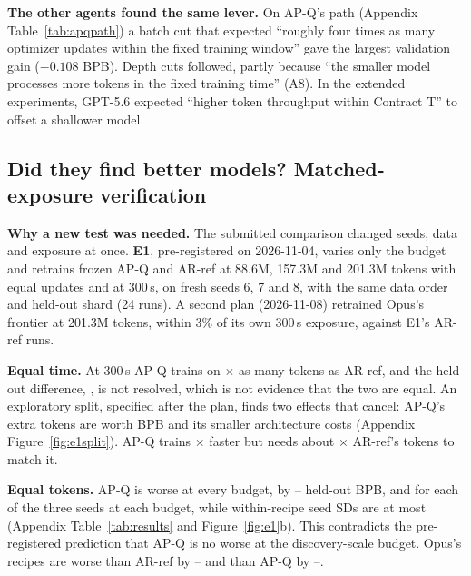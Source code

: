 \documentclass{article}
\begin{document}
 \textbf{The other agents found the same lever.} On AP-Q's path (Appendix Table~\ref{tab:apqpath}) a batch cut that expected ``roughly four times as many optimizer updates within the fixed training window'' gave the largest validation gain ($-0.108$ BPB). Depth cuts followed, partly because ``the smaller model processes more tokens in the fixed training time'' (A8). In the extended experiments, GPT-5.6 expected ``higher token throughput within Contract T'' to offset a shallower model.

\subsection{Did they find better models? Matched-exposure verification}\label{sec:verify}
 \textbf{Why a new test was needed.} The submitted comparison changed seeds, data and exposure at once. \textbf{E1}, pre-registered on 2026-11-04, varies only the budget and retrains frozen AP-Q and AR-ref at 88.6M, 157.3M and 201.3M tokens with equal updates and at 300\,s, on fresh seeds 6, 7 and 8, with the same data order and held-out shard (24 runs). A second plan (2026-11-08) retrained Opus's frontier at 201.3M tokens, within 3\% of its own 300\,s exposure, against E1's AR-ref runs.

 \textbf{Equal time.} At 300\,s AP-Q trains on \CREOneTokRatio$\times$ as many tokens as AR-ref, and the held-out difference, \CREOneTimeHeldThree{} \CREOneTimeHeldCI, is not resolved, which is not evidence that the two are equal. An exploratory split, specified after the plan, finds two effects that cancel: AP-Q's extra tokens are worth \CREOneExposure{} BPB and its smaller architecture costs \CREOneArch{} (Appendix Figure~\ref{fig:e1split}). AP-Q trains \CREOneRho$\times$ faster but needs about \CREOneK$\times$ AR-ref's tokens to match it.

 \textbf{Equal tokens.} AP-Q is worse at every budget, by \CREOneMatchedLoAbs--\CREOneMatchedHiAbs{} held-out BPB, and for each of the three seeds at each budget, while within-recipe seed SDs are at most \CREOneMaxSD{} (Appendix Table~\ref{tab:results} and Figure~\ref{fig:e1}b). This contradicts the pre-registered prediction that AP-Q is no worse at the discovery-scale budget. Opus's recipes are worse than AR-ref by \CRMTDLoAbs--\CRMTDHiAbs{} and than AP-Q by \CRFiveMTDAPLoAbs--\CRFiveMTDAPHiAbs.
\end{document}
